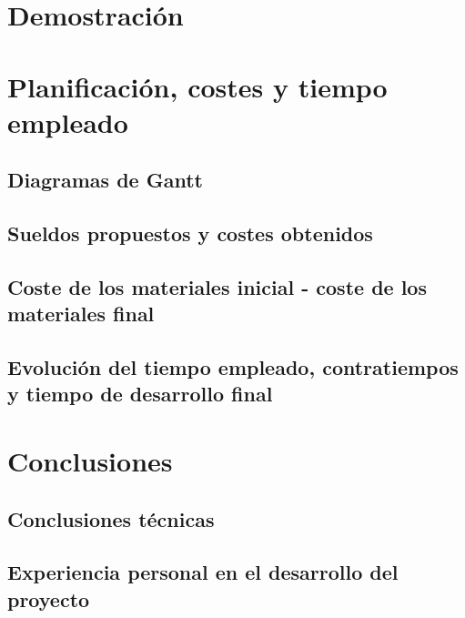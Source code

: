 \chapter{Demostración}

\chapter{Planificación, costes y tiempo empleado}

\section{Diagramas de Gantt}

\section{Sueldos propuestos y costes obtenidos}

\section{Coste de los materiales inicial - coste de los materiales final}

%
\section{Evolución del tiempo empleado, contratiempos y tiempo de desarrollo final}


\chapter{Conclusiones}

\section{Conclusiones técnicas}

\section{Experiencia personal en el desarrollo del proyecto}

